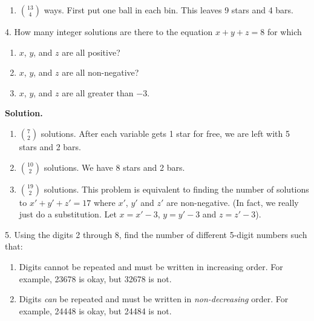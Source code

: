 \documentclass[10pt,]{book}
\theoremstyle{plain}
\theoremstyle{definition}
\theoremstyle{definition}
\theoremstyle{definition}
\numberwithin{equation}{section}
\begin{document}
\begin{exerciselist}
\begin{enumerate}[label=(\alph*)]
\item\hypertarget{li-587}{}\({13 \choose 4}\) ways.  First put one ball in each bin.  This leaves 9 stars and 4 bars.%
\end{enumerate}
\item[4.]\hypertarget{exercise-85}{}
How many integer solutions are there to the equation \(x + y + z = 8\)
for which
%
\leavevmode%
\begin{enumerate}[label=(\alph*)]
\item\hypertarget{li-588}{}\(x\), \(y\), and \(z\) are all positive?%
\item\hypertarget{li-589}{}\(x\), \(y\), and \(z\) are all non-negative?%
\item\hypertarget{li-590}{}\(x\), \(y\), and \(z\) are all greater than \(-3\).%
\end{enumerate}
\par\smallskip
\par\smallskip
\noindent\textbf{Solution.}\hypertarget{solution-125}{}\quad
\leavevmode%
\begin{enumerate}[label=(\alph*)]
\item\hypertarget{li-591}{}\({7 \choose 2}\) solutions.  After each variable gets 1 star for free, we are left with 5 stars and 2 bars.%
\item\hypertarget{li-592}{}\({10 \choose 2}\) solutions.  We have 8 stars and 2 bars.%
\item\hypertarget{li-593}{}\({19 \choose 2}\) solutions.  This problem is equivalent to finding the number of solutions to \(x' + y' + z' = 17\) where \(x'\), \(y'\) and \(z'\) are non-negative.  (In fact, we really just do a substitution.  Let \(x = x'- 3\), \(y = y' - 3\) and \(z = z' - 3\)).%
\end{enumerate}
\item[5.]\hypertarget{exercise-86}{}
Using the digits 2 through 8, find the number of different 5-digit numbers such that:
%
\leavevmode%
\begin{enumerate}[label=(\alph*)]
\item\hypertarget{li-594}{}
Digits cannot be repeated and must be written in increasing order.  For example, 23678 is okay, but 32678 is not.
%
\item\hypertarget{li-595}{}
Digits \emph{can} be repeated and must be written in \emph{non-decreasing} order.  For example, 24448 is okay, but 24484 is not.
%
\end{enumerate}
\par\smallskip
\par\smallskip

\end{exerciselist}
\end{document}
